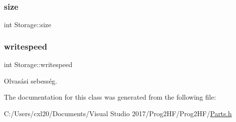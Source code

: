 \subsubsection{\texorpdfstring{size}{size}}
{\footnotesize\ttfamily int Storage\+::size\hspace{0.3cm}{\ttfamily [protected]}}

\mbox{\label{class_storage_a0198a1483ccf849d48c76da88599ba8b}} 
\subsubsection{\texorpdfstring{writespeed}{writespeed}}
{\footnotesize\ttfamily int Storage\+::writespeed\hspace{0.3cm}{\ttfamily [protected]}}



Olvasási sebesség. 



The documentation for this class was generated from the following file\+:\begin{DoxyCompactItemize}
\item 
C\+:/\+Users/cxl20/\+Documents/\+Visual Studio 2017/\+Prog2\+H\+F/\+Prog2\+H\+F/\mbox{\hyperlink{_parts_8h}{Parts.\+h}}\end{DoxyCompactItemize}
